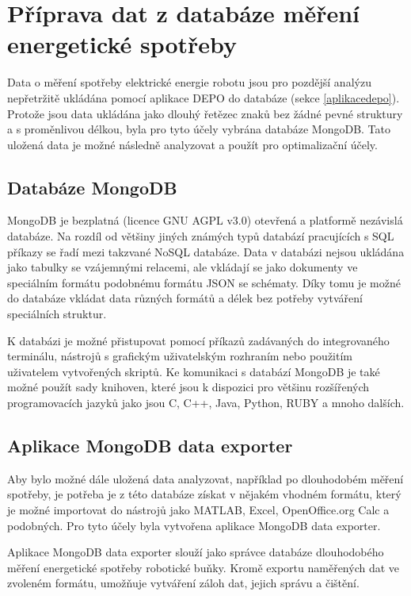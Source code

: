 \chapter{Příprava dat z databáze měření energetické spotřeby}

Data o měření spotřeby elektrické energie robotu jsou pro pozdější analýzu nepřetržitě ukládána pomocí aplikace DEPO do databáze (sekce \ref{aplikacedepo}). Protože jsou data ukládána jako dlouhý řetězec znaků bez žádné pevné struktury a s proměnlivou délkou, byla pro tyto účely vybrána databáze MongoDB. Tato uložená data je možné následně analyzovat a použít pro optimalizační účely.

\section{Databáze MongoDB}

MongoDB je bezplatná (licence GNU AGPL v3.0) otevřená a platformě nezávislá databáze. Na rozdíl od většiny jiných známých typů databází pracujících s SQL příkazy se řadí mezi takzvané NoSQL databáze. Data v databázi nejsou ukládána jako tabulky se vzájemnými relacemi, ale vkládají se jako dokumenty ve speciálním formátu podobnému formátu JSON se schématy. Díky tomu je možné do databáze vkládat data různých formátů a délek bez potřeby vytváření speciálních struktur. 

K databázi je možné přistupovat pomocí příkazů zadávaných do integrovaného terminálu, nástrojů s grafickým uživatelským rozhraním nebo použitím uživatelem vytvořených skriptů. Ke komunikaci s databází MongoDB je také možné použít sady knihoven, které jsou k dispozici pro většinu rozšířených programovacích jazyků jako jsou C, C++, Java, Python, RUBY a mnoho dalších.     

\section{Aplikace MongoDB data exporter}

Aby bylo možné dále uložená data analyzovat, například po dlouhodobém měření spotřeby, je potřeba je z této databáze získat v nějakém vhodném formátu, který je možné importovat do nástrojů jako MATLAB, Excel, OpenOffice.org Calc a podobných. Pro tyto účely byla vytvořena aplikace MongoDB data exporter. 

Aplikace MongoDB data exporter slouží jako správce databáze dlouhodobého měření energetické spotřeby robotické buňky. Kromě exportu naměřených dat ve zvoleném formátu, umožňuje vytváření záloh dat, jejich správu a čištění. 

